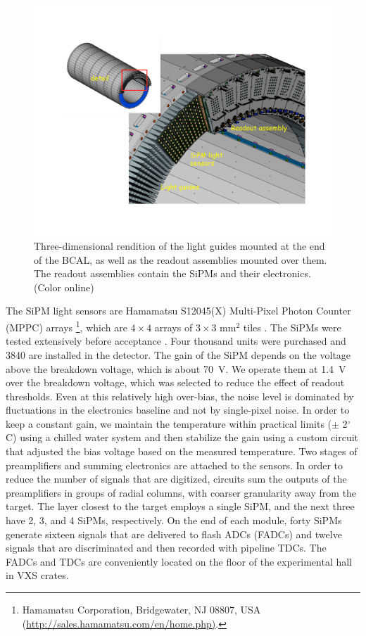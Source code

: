 \begin{figure}[tbp]\centering
\includegraphics[scale=0.4]{figures/bcal_assemblies.pdf}
\caption{\label{fig:bcal:bcal_assemblies}
   Three-dimensional rendition of the light guides mounted at the end of the 
   BCAL, as well as the readout assemblies mounted over them. The 
   readout assemblies contain the 
   SiPMs and their electronics.  (Color online)
  }
\end{figure}


The SiPM light sensors are Hamamatsu S12045(X) Multi-Pixel Photon Counter (MPPC) arrays \footnote{Hamamatsu Corporation, Bridgewater, NJ 08807, USA \\ (\url{http://sales.hamamatsu.com/en/home.php)}.}, 
which are $4\times4$ arrays of $3\times3$ mm$^2$ tiles \cite{hdnote2913}. The SiPMs were tested extensively before acceptance \cite{Barbosa2012100,Qiang2013234,soto,Soto201489,BeattieIEEE,doi:10.1063/1.4955340}. Four thousand units were purchased and 3840 are installed in the detector. The gain of the SiPM depends on the voltage above the breakdown voltage, which is about 70~V. We operate them at 1.4~V over the breakdown voltage, which was selected to reduce the effect of readout thresholds. Even at this relatively high over-bias, the noise level is dominated by fluctuations in the electronics baseline and not by single-pixel noise. In order to keep a constant gain, we maintain the temperature within practical limits ($\pm$ 2$^\circ$C) using a chilled water system and then stabilize the gain using a custom circuit that adjusted the bias voltage based on the measured temperature. Two stages of preamplifiers and summing electronics are attached to the sensors. In order to reduce the number of signals that are digitized, circuits sum the outputs of the preamplifiers in groups of radial columns, with coarser granularity away from the target. The layer closest to the target employs a single SiPM, and the next three have 2, 3, and 4 SiPMs, respectively. On the end of each module, forty SiPMs generate sixteen signals that are delivered to flash ADCs (FADCs) and twelve signals that are discriminated and then recorded with pipeline TDCs. The FADCs and TDCs are conveniently located on the floor of the experimental hall in VXS crates.

